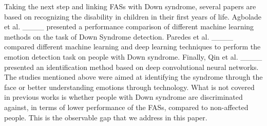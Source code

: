 Taking the next step and linking FASs with Down syndrome, several papers are based on recognizing the disability in children in their first years of life.
Agbolade et al. ____ presented a performance comparison of different machine learning methods on the task of Down Syndrome detection.
Paredes et al. ____ compared different machine learning and deep learning techniques to perform the emotion detection task on people with Down syndrome.
Finally, Qin et al. ____ presented an identification method based on deep convolutional neural networks. 
The studies mentioned above were aimed at identifying the syndrome through the face or better understanding emotions through technology. 
What is not covered in previous works is whether people with Down syndrome are discriminated against, in terms of lower performance of the FASs, compared to non-affected people.
This is the observable gap that we address in this paper.


